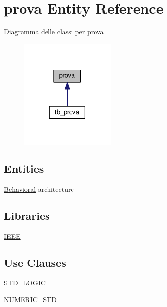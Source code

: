 \hypertarget{classprova}{\section{prova Entity Reference}
\label{classprova}
}


Diagramma delle classi per prova\nopagebreak
\begin{figure}[H]
\begin{center}
\leavevmode
\includegraphics[width=134pt]{classprova__inherit__graph}
\end{center}
\end{figure}
\subsection*{Entities}
\begin{DoxyCompactItemize}
\item 
\hyperlink{classprova_1_1_behavioral}{Behavioral} architecture
\end{DoxyCompactItemize}
\subsection*{Libraries}
 \begin{DoxyCompactItemize}
\item 
\hyperlink{classprova_ae4f03c286607f3181e16b9aa12d0c6d4}{I\+E\+E\+E} 
\end{DoxyCompactItemize}
\subsection*{Use Clauses}
 \begin{DoxyCompactItemize}
\item 
\hyperlink{classprova_aa4b2b25246a821511120e3149b003563}{S\+T\+D\+\_\+\+L\+O\+G\+I\+C\+\_}   
\item 
\hyperlink{classprova_ae00f3f04545af57582ff10609eee23e2}{N\+U\+M\+E\+R\+I\+C\+\_\+\+S\+T\+D}   
\end{DoxyCompactItemize}
